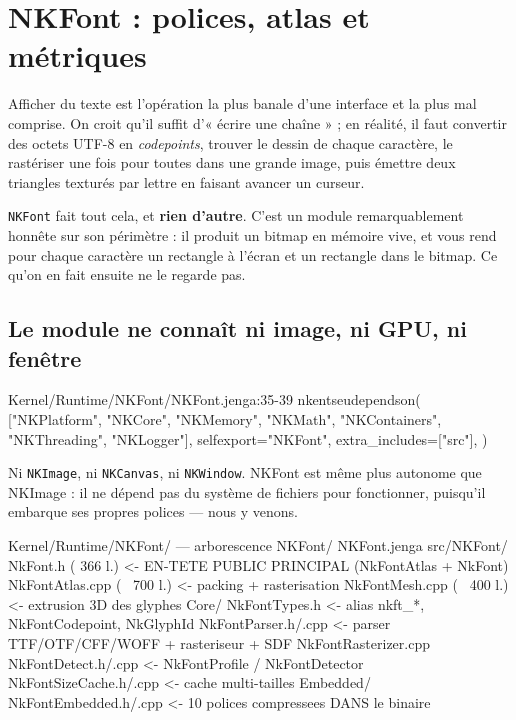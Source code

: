 \chapter{NKFont : polices, atlas et métriques}

Afficher du texte est l'opération la plus banale d'une interface et la plus mal
comprise. On croit qu'il suffit d'« écrire une chaîne » ; en réalité, il faut
convertir des octets UTF-8 en \emph{codepoints}, trouver le dessin de chaque
caractère, le rastériser une fois pour toutes dans une grande image, puis
émettre deux triangles texturés par lettre en faisant avancer un curseur.

\texttt{NKFont} fait tout cela, et \textbf{rien d'autre}. C'est un module
remarquablement honnête sur son périmètre : il produit un bitmap en mémoire
vive, et vous rend pour chaque caractère un rectangle à l'écran et un rectangle
dans le bitmap. Ce qu'on en fait ensuite ne le regarde pas.

\section{Le module ne connaît ni image, ni GPU, ni fenêtre}

\begin{nkcode}{Kernel/Runtime/NKFont/NKFont.jenga:35-39}
    nkentseudependson(
        ["NKPlatform", "NKCore", "NKMemory", "NKMath", "NKContainers", "NKThreading", "NKLogger"],
        selfexport="NKFont",
        extra_includes=["src"],
    )
\end{nkcode}

Ni \texttt{NKImage}, ni \texttt{NKCanvas}, ni \texttt{NKWindow}. NKFont est même
plus autonome que NKImage : il ne dépend pas du système de fichiers pour
fonctionner, puisqu'il embarque ses propres polices — nous y venons.

\begin{nkcode}{Kernel/Runtime/NKFont/ — arborescence}
NKFont/
  NKFont.jenga
  src/NKFont/
    NkFont.h            ( 366 l.)  <- EN-TETE PUBLIC PRINCIPAL (NkFontAtlas + NkFont)
    NkFontAtlas.cpp     (~ 700 l.) <- packing + rasterisation
    NkFontMesh.cpp      (~ 400 l.) <- extrusion 3D des glyphes
    Core/
      NkFontTypes.h                <- alias nkft_*, NkFontCodepoint, NkGlyphId
      NkFontParser.h/.cpp          <- parser TTF/OTF/CFF/WOFF + rasteriseur + SDF
      NkFontRasterizer.cpp
      NkFontDetect.h/.cpp          <- NkFontProfile / NkFontDetector
      NkFontSizeCache.h/.cpp       <- cache multi-tailles
    Embedded/
      NkFontEmbedded.h/.cpp        <- 10 polices compressees DANS le binaire
\end{nkcode}

